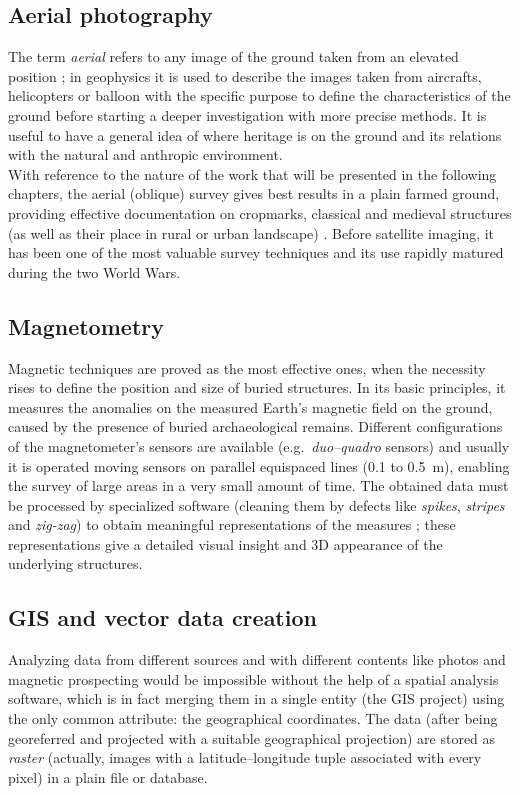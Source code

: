         \subsection{Aerial photography}
            The term \emph{aerial} refers to any image of the ground taken from an elevated position \cite{wiki:aerial}; in geophysics it is used to describe the images taken from aircrafts, helicopters or balloon with the specific purpose to define the characteristics of the ground before starting a deeper investigation with more precise methods. It is useful to have a general idea of where heritage is on the ground and its relations with the natural and anthropic environment.\\
            With reference to the nature of the work that will be presented in the following chapters, the aerial (oblique) survey gives best results in a plain farmed ground, providing effective documentation on cropmarks, classical and medieval structures (as well as their place in rural or urban landscape) \cite[pp.~11--12]{arch-site-detection}. Before satellite imaging, it has been one of the most valuable survey techniques and its use rapidly matured during the two World Wars.
            
        \subsection{Magnetometry}
            Magnetic techniques are proved as the most effective ones, when the necessity rises to define the position and size of buried structures. In its basic principles, it measures the anomalies on the measured Earth's magnetic field on the ground, caused by the presence of buried archaeological remains. Different configurations of the magnetometer's sensors are available (e.g.\ \emph{duo--quadro} sensors) and usually it is operated moving sensors on parallel equispaced lines (\num{0.1} to \SI{0.5}{\meter}), enabling the survey of large areas in a very small amount of time. The obtained data must be processed by specialized software (cleaning them by defects like \emph{spikes}, \emph{stripes} and \emph{zig-zag}) to obtain meaningful representations of the measures \cite[p.~47]{remote-ciminale}; these representations give a detailed visual insight and 3D appearance of the underlying structures.

        \subsection{GIS and vector data creation}
            Analyzing data from different sources and with different contents like photos and magnetic prospecting would be impossible without the help of a spatial analysis software, which is in fact merging them in a single entity (the GIS project) using the only common attribute: the geographical coordinates. The data (after being georeferred and projected with a suitable geographical projection) are stored as \emph{raster} (actually, images with a latitude--longitude tuple associated with every pixel) in a plain file or database.\\

